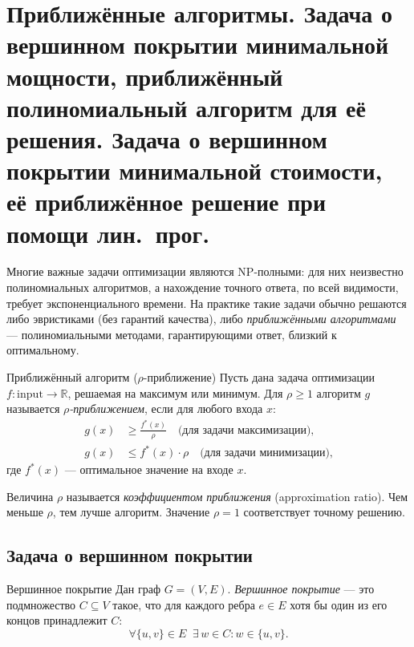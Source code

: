 
\section{Приближённые алгоритмы. Задача о вершинном покрытии минимальной мощности, приближённый полиномиальный алгоритм для её решения. Задача о вершинном покрытии минимальной стоимости, её приближённое решение при помощи лин.~прог.}

Многие важные задачи оптимизации являются NP-полными: для них неизвестно полиномиальных алгоритмов, а нахождение точного ответа, по всей видимости, требует экспоненциального времени. На практике такие задачи обычно решаются либо эвристиками (без гарантий качества), либо \emph{приближёнными алгоритмами} --- полиномиальными методами, гарантирующими ответ, близкий к оптимальному.

\begin{Definition}{Приближённый алгоритм ($\rho$-приближение)}{}
	Пусть дана задача оптимизации $f\colon \mathrm{input} \to \mathbb{R}$, решаемая на максимум или минимум. Для $\rho \geq 1$ алгоритм $g$ называется \emph{$\rho$-приближением}, если для любого входа $x$:
	\begin{align*}
		g(x) &\geq \frac{f^*(x)}{\rho} \quad \text{(для задачи максимизации),} \\
		g(x) &\leq f^*(x) \cdot \rho \quad \text{(для задачи минимизации),}
	\end{align*}
	где $f^*(x)$ --- оптимальное значение на входе $x$.
\end{Definition}

\begin{Remark}{}{}
	Величина $\rho$ называется \emph{коэффициентом приближения} (approximation ratio). Чем меньше $\rho$, тем лучше алгоритм. Значение $\rho = 1$ соответствует точному решению.
\end{Remark}

\subsection{Задача о вершинном покрытии}

\begin{Definition}{Вершинное покрытие}{}
	Дан граф $G = (V, E)$. \emph{Вершинное покрытие} --- это подмножество $C \subseteq V$ такое, что для каждого ребра $e \in E$ хотя бы один из его концов принадлежит $C$:
	\[
	\forall \{u,v\} \in E \;\; \exists\, w \in C \colon w \in \{u,v\}.
	\]
\end{Definition}

